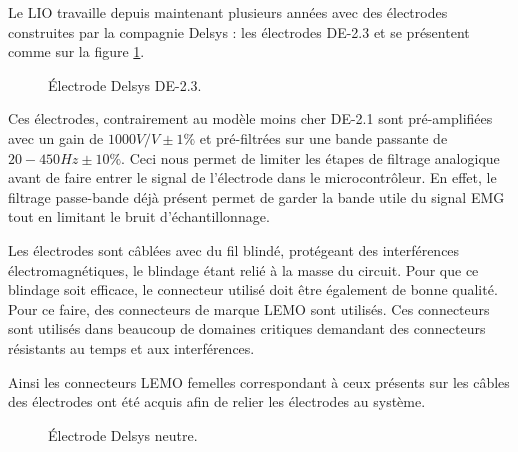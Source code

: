 \documentclass[letterpaper, twoside, 12pt, memoire, creativecommons, hyperref]{thETS}
\begin{document}
Le LIO travaille depuis maintenant plusieurs années avec des électrodes construites par la compagnie Delsys : les électrodes DE-2.3 et se présentent comme sur la figure \ref{fig:de2.3}. 

\begin{figure}
	\centering
	\caption{Électrode Delsys DE-2.3.}
	\label{fig:de2.3}
\end{figure}

Ces électrodes, contrairement au modèle moins cher DE-2.1 sont pré-amplifiées avec un gain de $1000 V/V \pm 1\%$ et pré-filtrées sur une bande passante de $20-450 Hz \pm 10\%$. Ceci nous permet de limiter les étapes de filtrage analogique avant de faire entrer le signal de l'électrode dans le microcontrôleur. En effet, le filtrage passe-bande déjà présent permet de garder la bande utile du signal EMG tout en limitant le bruit d'échantillonnage.

Les électrodes sont câblées avec du fil blindé, protégeant des interférences électromagnétiques, le blindage étant relié à la masse du circuit. Pour que ce blindage soit efficace, le connecteur utilisé doit être également de bonne qualité. Pour ce faire, des connecteurs de marque LEMO sont utilisés. Ces connecteurs sont utilisés dans beaucoup de domaines critiques demandant des connecteurs résistants au temps et aux interférences. 

Ainsi les connecteurs LEMO femelles correspondant à ceux présents sur les câbles des électrodes ont été acquis afin de relier les électrodes au système.

\begin{figure}
	\centering
	\caption{Électrode Delsys neutre.}
	\label{fig:delsysneutre}
\end{figure}
\end{document}
